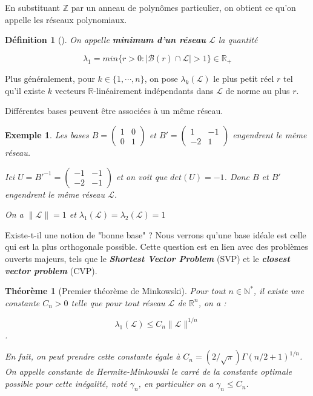 \documentclass[a4paper,12pt]{report}  %
\theoremstyle{definitionstyle}
\newtheorem{definition}{Définition}[chapter] %
\theoremstyle{examplestyle}
\newtheorem{example}{Exemple}[chapter] %
\theoremstyle{remarkstyle}
\theoremstyle{propositionstyle}
\theoremstyle{theoremstyle}
\newtheorem{theoreme}{Théorème}[chapter]  %
\theoremstyle{proofstyle}
\begin{document}
En substituant $\mathbb{Z}$ par un anneau de polynômes particulier, on obtient ce qu'on appelle les réseaux polynomiaux. %
	
\begin{definition}[\cite{Wallet}]
	On appelle \textbf{minimum d'un réseau} $\mathcal{L}$ la quantité
		
	$$\lambda_1 = min\{r>0 : |\mathcal{B}(r)\cap\mathcal{L}|>1\} \in \mathbb{R_+}$$
\end{definition}

Plus généralement, pour $k \in \{1, \cdots, n\}$, on pose $\lambda_k(\mathcal{L})$ le plus petit réel $r$ tel qu'il existe $k$ vecteurs $\mathbb{R}$-linéairement indépendants dans $\mathcal{L}$ de norme au plus $r$.

Différentes bases peuvent être associées à un même réseau.
\begin{example}
	Les bases $B = \left(\begin{array}{rr}1 & 0 \\0 & 1\end{array}\right)$ et $B'=\left(\begin{array}{rr}1 & -1 \\-2 & 1\end{array}\right)$ engendrent le même réseau.
		
	Ici $U = B'^{-1} = \left(\begin{array}{rr}-1 & -1 \\-2 & -1\end{array}\right)$ et on voit que $det(U)=-1$. Donc $B$ et $B'$ engendrent le même réseau $\mathcal{L}$.
		
	On a $\|\mathcal{L}\| = 1$ et $\lambda_1( \mathcal{L}) = \lambda_2( \mathcal{L}) = 1$
\end{example}

Existe-t-il une notion de "bonne base" ? Nous verrons qu'une base idéale est celle qui est la plus orthogonale possible. Cette question est en lien avec des problèmes ouverts majeurs, tels que le \textbf{\textit{Shortest Vector Problem}} (SVP) et le \textbf{\textit{closest vector problem}} (CVP).


\begin{theoreme}[Premier théorème de Minkowski]
Pour tout $n \in \mathbb{N}^*$, il existe une constante $C_n > 0$ telle que pour tout réseau $\mathcal{L}$ de $\mathbb{R}^n$, on a :

$$\lambda_1(\mathcal{L}) \leq C_n \|\mathcal{L}\|^{1/n}$$.

En fait, on peut prendre cette constante égale à $C_n=(2/\sqrt{\pi}) \Gamma(n/2+1)^{1/n}$. On appelle constante de Hermite-Minkowski le carré de la constante optimale possible pour cette inégalité, noté $\gamma _n$, en particulier on a $\gamma _n \leq C_n$.
\end{theoreme}
\end{document}
